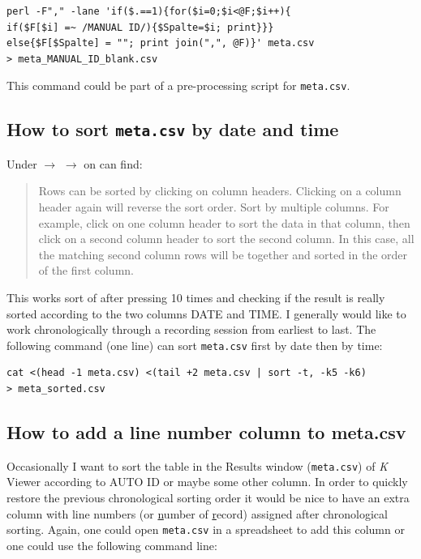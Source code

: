 \documentclass[English, 11pt, twoside, authoryear]{article}
\begin{document}
\begin{lstlisting}
perl -F"," -lane 'if($.==1){for($i=0;$i<@F;$i++){
if($F[$i] =~ /MANUAL ID/){$Spalte=$i; print}}}
else{$F[$Spalte] = ""; print join(",", @F)}' meta.csv
> meta_MANUAL_ID_blank.csv
\end{lstlisting}

This command could be part of a pre-processing script for \texttt{meta.csv}.

%
%
%
\subsection{How to sort \texttt{meta.csv} by date and time}
%
%
%
Under  $\rightarrow$  $\rightarrow$  on can find:

\begin{quote}
Rows can be sorted by clicking on column headers. Clicking on a column header again will reverse the sort order. Sort by multiple columns. For example, click on one column header to sort the data in that column, then click on a second column header to sort the second column. In this case, all the matching second column rows will be together and sorted in the order of the first column.
\end{quote}

This works sort of after pressing 10 times and checking if the result is really sorted according to the two columns DATE and TIME. I generally would like to work chronologically through a recording session from earliest to last. The following command (one line) can sort \texttt{meta.csv} first by date then by time:

\begin{lstlisting}
cat <(head -1 meta.csv) <(tail +2 meta.csv | sort -t, -k5 -k6) 
> meta_sorted.csv
\end{lstlisting}

%
%
%
\subsection{How to add a line number column to meta.csv}
%
%
%
Occasionally I want to sort the table in the Results window (\texttt{meta.csv}) of \emph{K} Viewer according to AUTO ID or maybe some other column. In order to quickly restore the previous chronological sorting order it would be nice to have an extra column with line numbers (or \underline{n}umber of \underline{r}ecord) assigned after chronological sorting. Again, one could open \texttt{meta.csv} in a spreadsheet to add this column or one could use the following command line:
\end{document}
